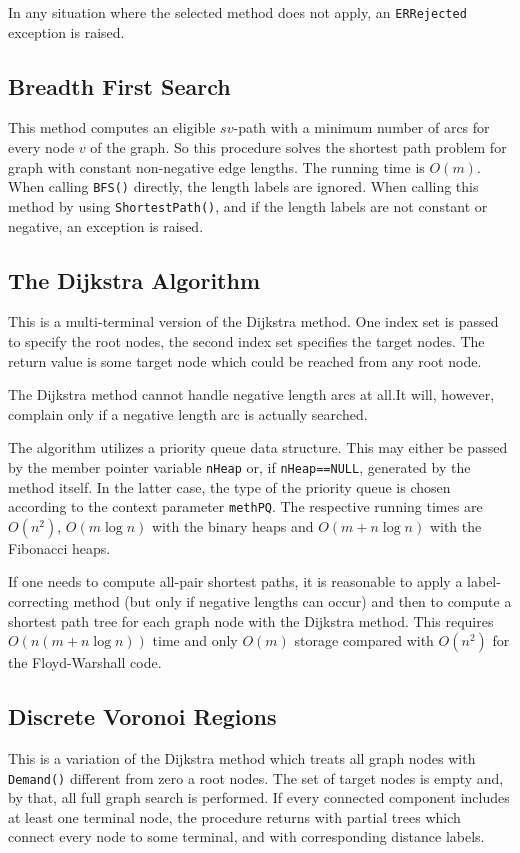 \documentclass[a4paper,11pt,twoside]{book}
\begin{document}
\begin{multicols}{2}
In any situation where the selected method does not apply, an \verb/ERRejected/
exception is raised.


\subsection{Breadth First Search}
This method computes an eligible $sv$-path with a minimum number of arcs for
every node $v$ of the graph. So this procedure solves the shortest path problem
for graph with constant non-negative edge lengths. The running time is $O(m)$.
When calling \verb/BFS()/ directly, the length labels are ignored. When calling
this method by using \verb/ShortestPath()/, and if the length labels are
not constant or negative, an exception is raised.


\subsection{The Dijkstra Algorithm}
\label{dijkstra}
This is a multi-terminal version of the Dijkstra method. One index set
is passed to specify the root nodes, the second index set specifies the
target nodes. The return value is some target node which could be reached
from any root node.

The Dijkstra method cannot handle negative length arcs at all.It will,
however, complain only if a negative length arc is actually searched.

The algorithm utilizes a priority queue data structure. This may
either be passed by the member pointer variable \verb/nHeap/ or, if
\verb/nHeap==NULL/, generated by the method itself. In the latter case,
the type of the priority queue is chosen according to the context parameter
\verb/methPQ/. The respective running times are $O(n^2)$, $O(m\log{n})$ with
the binary heaps and $O(m+n\log{n})$ with the Fibonacci heaps.

If one needs to compute all-pair shortest paths, it is reasonable to apply
a label-correcting method (but only if negative lengths can occur) and then
to compute a shortest path tree for each graph node with the Dijkstra method.
This requires $O(n(m+n\log{n}))$ time and only $O(m)$ storage compared with
$O(n^2)$ for the Floyd-Warshall code.


\subsection{Discrete Voronoi Regions}
\label{slb_voronoi}
This is a variation of the Dijkstra method which treats all graph nodes with
\verb/Demand()/ different from zero a root nodes. The set of target nodes is
empty and, by that, all full graph search is performed. If every connected
component includes at least one terminal node, the procedure returns with
partial trees which connect every node to some terminal, and with corresponding
distance labels.


\end{multicols}
\end{document}

